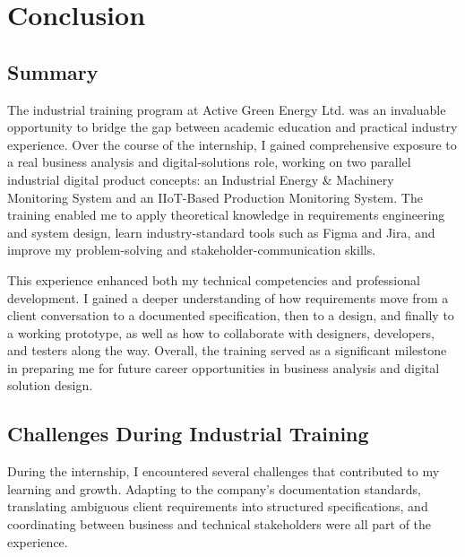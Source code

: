 \chapter{Conclusion}
\label{chapter-5}

\section{Summary}

\par The industrial training program at Active Green Energy Ltd. was an invaluable opportunity to bridge the gap between academic education and practical industry experience. Over the course of the internship, I gained comprehensive exposure to a real business analysis and digital-solutions role, working on two parallel industrial digital product concepts: an Industrial Energy \& Machinery Monitoring System and an IIoT-Based Production Monitoring System. The training enabled me to apply theoretical knowledge in requirements engineering and system design, learn industry-standard tools such as Figma and Jira, and improve my problem-solving and stakeholder-communication skills.

\par This experience enhanced both my technical competencies and professional development. I gained a deeper understanding of how requirements move from a client conversation to a documented specification, then to a design, and finally to a working prototype, as well as how to collaborate with designers, developers, and testers along the way. Overall, the training served as a significant milestone in preparing me for future career opportunities in business analysis and digital solution design.


\section{Challenges During Industrial Training}
\par During the internship, I encountered several challenges that contributed to my learning and growth. Adapting to the company's documentation standards, translating ambiguous client requirements into structured specifications, and coordinating between business and technical stakeholders were all part of the experience.

